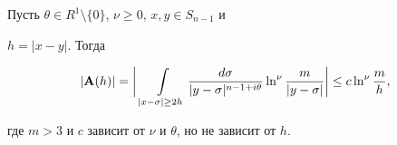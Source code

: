 \begin{lems}


Пусть $\theta\in R^1\setminus \{0\}$, $\nu \ge 0$, $x,y \in S_{n-1}$ и


$h=|x-y|$. Тогда


$$


|{\bold A}(h)|=\bigg|\, \int \limits_{|x-\sigma| \ge 2h} \frac{d\sigma}{|y-


\sigma|


^{n-1+i\theta}} \ln^\nu \frac{m}{|y-\sigma|} \bigg| \le c \ln^\nu


\frac{m}{h},


$$


где $m > 3$ и $c$ зависит от $\nu$ и $\theta$, но не зависит от $h$.


\end{lems}





